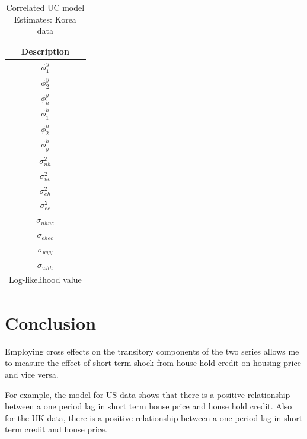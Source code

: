 \documentclass[fleqn]{article}
\begin{document}
\begin{outline}[enumerate]
\begin{table}
	\begin{center}
		\caption{Correlated UC model Estimates: Korea data}
		\begin{tabular}{c}
			\toprule
			Description\\
			\midrule
			$\phi^y_{1}$ \\
			$\phi^y_{2}$ \\
			$\phi^y_{h}$ \\		
			$\phi^h_{1}$ \\
			$\phi^h_{2}$ \\
			$\phi^h_{y}$ \\
			$\sigma^2_{nh}$\\
			$\sigma^2_{nc}$\\
			$\sigma^2_{eh}$\\
			$\sigma^2_{ec}$\\
			$\sigma_{nhnc}$\\
			$\sigma_{ehec}$\\
			$\sigma_{wyy}$\\
			$\sigma_{whh}$\\
			Log-likelihood value\\
			\bottomrule
		\end{tabular}%
	\end{center}
\end{table}

\clearpage
\section{Conclusion}
Employing cross effects on the transitory components of the two series allows me to measure the effect of short term shock from house hold credit on housing price and vice versa.  

For example, the model for US data shows that there is a positive relationship between a one period lag in short term house price and house hold credit. Also for the UK data, there is a positive relationship between a one period lag in short term credit and house price.


\end{outline}
\end{document}
